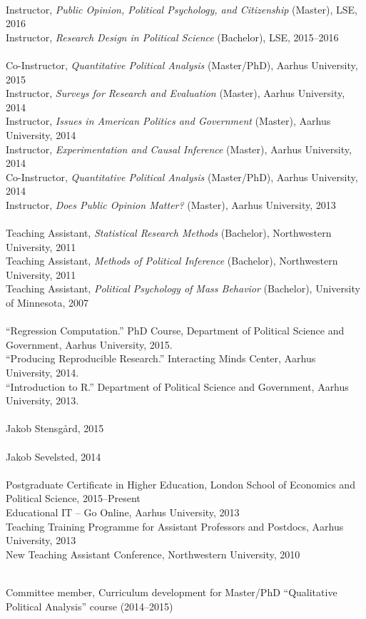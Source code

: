 \documentclass[12pt]{article}
\renewcommand{\section}[1]{\pagebreak[3]%
    \llap{\scshape\smash{\parbox[t]{\marginparwidth}{\raggedright {\color{lg}#1}}}}%
    \vspace{-\baselineskip}\par}
\newcommand{\topic}[1]{\pagebreak[3]\indent {\color{lg}{\footnotesize #1 }}\\}
\newcommand{\entry}[1]{\indent {\color{lg}\guillemotright}\hspace{2pt}#1\vspace{.25em}\\}
\begin{document}
\section{Teaching and Advising}
\topic{Experience: London School of Economics and Political Science}
\entry{Instructor, {\em Public Opinion, Political Psychology, and Citizenship} (Master), LSE, 2016}
\entry{Instructor, {\em Research Design in Political Science} (Bachelor), LSE, 2015--2016}
\topic{Experience: Aarhus University}
\entry{Co-Instructor, {\em Quantitative Political Analysis} (Master/PhD), Aarhus University, 2015}
\entry{Instructor, {\em Surveys for Research and Evaluation} (Master), Aarhus University, 2014}
\entry{Instructor, {\em Issues in American Politics and Government} (Master), Aarhus University, 2014}
\entry{Instructor, {\em Experimentation and Causal Inference} (Master), Aarhus University, 2014}
\entry{Co-Instructor, {\em Quantitative Political Analysis} (Master/PhD), Aarhus University, 2014}
\entry{Instructor, {\em Does Public Opinion Matter?} (Master), Aarhus University, 2013}
\topic{Experience: Northwestern University}
\entry{Teaching Assistant, {\em Statistical Research Methods} (Bachelor), Northwestern University, 2011} %
\entry{Teaching Assistant, {\em Methods of Political Inference} (Bachelor), Northwestern University, 2011} %
\entry{Teaching Assistant, {\em Political Psychology of Mass Behavior} (Bachelor), University of Minnesota, 2007} %

\topic{Short courses}
\entry{``Regression Computation.'' PhD Course, Department of Political Science and Government, Aarhus University, 2015.}
\entry{``Producing Reproducible Research.'' Interacting Minds Center, Aarhus University, 2014.}
\entry{``Introduction to R.'' Department of Political Science and Government, Aarhus University, 2013.}

\topic{Master Advising, Aarhus University}
\entry{Jakob Stensg{\aa}rd, 2015}

\topic{Internship Supervision, Aarhus University}
\entry{Jakob Sevelsted, 2014}

\topic{Pedagogical Training}
\entry{Postgraduate Certificate in Higher Education, London School of Economics and Political Science, 2015--Present}
\entry{Educational IT -- Go Online, Aarhus University, 2013}
\entry{Teaching Training Programme for Assistant Professors and Postdocs, Aarhus University, 2013}
\entry{New Teaching Assistant Conference, Northwestern University, 2010}

\section{Service}
\topic{Departmental (Aarhus University)}
\entry{Committee member, Curriculum development for Master/PhD ``Qualitative Political Analysis'' course (2014--2015)}
\end{document}
